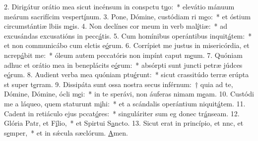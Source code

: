 2. Dirigátur orátio mea sicut incénsum in conspctu t\uline{u}o:~* elevátio mánuum meárum sacrifícim vespert\uline{í}num.
3. Pone, Dómine, custódiam ri m\uline{e}o:~* et óstium circumstántiæ lbiis m\uline{e}is.
4. Non declínes cor meum in verb mal\uline{í}tiæ:~* ad excusándas excusatións in pecc\uline{á}tis.
5. Cum homínibus operántibus inquit\uline{á}tem:~* et non communicábo cum elctis e\uline{ó}rum.
6. Corrípiet me justus in misericórdia, et ncrep\uline{á}bit me:~* óleum autem peccatóris non impínt caput m\uline{e}um.
7. Quóniam adhuc et orátio mea in beneplácits e\uline{ó}rum:~* absórpti sunt juncti petræ júdces e\uline{ó}rum.
8. Audient verba mea quóniam ptu\uline{é}runt:~* sicut crassitúdo terræ erúpta st super t\uline{e}rram.
9. Dissipáta sunt ossa nostra secus inférnum:~† quia ad te, Dómine, Dómine, ócli m\uline{e}i:~* in te sperávi, non áuferas nimam m\uline{e}am.
10. Custódi me a láqueo, quem staturunt m\uline{i}hi:~* et a scándalis operántium niquit\uline{á}tem.
11. Cadent in retiáculo ejus pccat\uline{ó}res:~* singuláriter sum eg donec tr\uline{á}nseam.
12. Glória Patr, et F\uline{í}lio,~* et Spirtui S\uline{a}ncto.
13. Sicut erat in princípio, et nnc, et s\uline{e}mper,~* et in sǽcula sæclórum. \uline{A}men.
